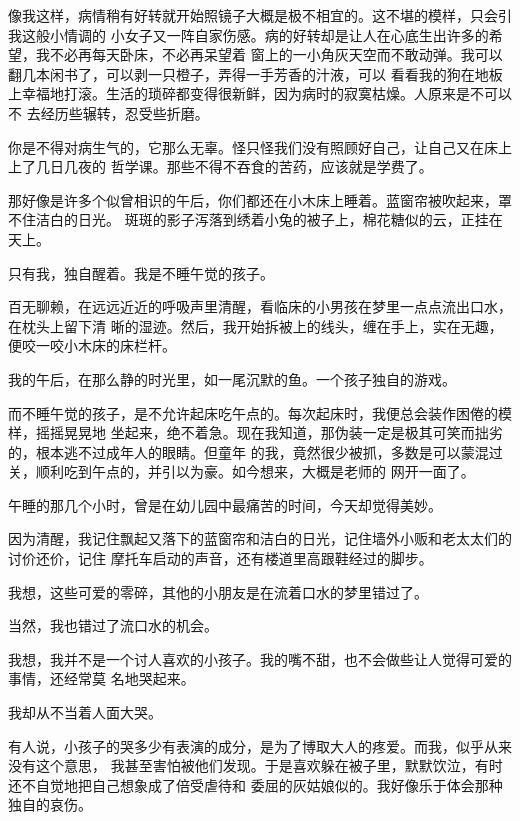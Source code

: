 		像我这样，病情稍有好转就开始照镜子大概是极不相宜的。这不堪的模样，只会引我这般小情调的
	小女子又一阵自家伤感。病的好转却是让人在心底生出许多的希望，我不必再每天卧床，不必再呆望着
	窗上的一小角灰天空而不敢动弹。我可以翻几本闲书了，可以剥一只橙子，弄得一手芳香的汁液，可以
	看看我的狗在地板上幸福地打滚。生活的琐碎都变得很新鲜，因为病时的寂寞枯燥。人原来是不可以不
	去经历些辗转，忍受些折磨。


		你是不得对病生气的，它那么无辜。怪只怪我们没有照顾好自己，让自己又在床上上了几日几夜的
	哲学课。那些不得不吞食的苦药，应该就是学费了。

	\endwriting



		那好像是许多个似曾相识的午后，你们都还在小木床上睡着。蓝窗帘被吹起来，罩不住洁白的日光。
	斑斑的影子泻落到绣着小兔的被子上，棉花糖似的云，正挂在天上。

		只有我，独自醒着。我是不睡午觉的孩子。

		百无聊赖，在远远近近的呼吸声里清醒，看临床的小男孩在梦里一点点流出口水，在枕头上留下清
	晰的湿迹。然后，我开始拆被上的线头，缠在手上，实在无趣，便咬一咬小木床的床栏杆。

		我的午后，在那么静的时光里，如一尾沉默的鱼。一个孩子独自的游戏。

		而不睡午觉的孩子，是不允许起床吃午点的。每次起床时，我便总会装作困倦的模样，摇摇晃晃地
	坐起来，绝不着急。现在我知道，那伪装一定是极其可笑而拙劣的，根本逃不过成年人的眼睛。但童年
	的我，竟然很少被抓，多数是可以蒙混过关，顺利吃到午点的，并引以为豪。如今想来，大概是老师的
	网开一面了。

		午睡的那几个小时，曾是在幼儿园中最痛苦的时间，今天却觉得美妙。

		因为清醒，我记住飘起又落下的蓝窗帘和洁白的日光，记住墙外小贩和老太太们的讨价还价，记住
	摩托车启动的声音，还有楼道里高跟鞋经过的脚步。

		我想，这些可爱的零碎，其他的小朋友是在流着口水的梦里错过了。

		当然，我也错过了流口水的机会。

		我想，我并不是一个讨人喜欢的小孩子。我的嘴不甜，也不会做些让人觉得可爱的事情，还经常莫
	名地哭起来。

		我却从不当着人面大哭。

		有人说，小孩子的哭多少有表演的成分，是为了博取大人的疼爱。而我，似乎从来没有这个意思，
	我甚至害怕被他们发现。于是喜欢躲在被子里，默默饮泣，有时还不自觉地把自己想象成了倍受虐待和
	委屈的灰姑娘似的。我好像乐于体会那种独自的哀伤。

